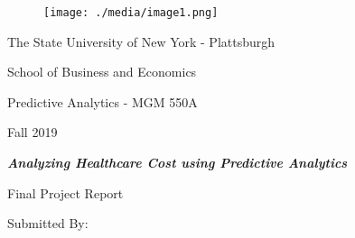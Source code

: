 \documentclass[12pt]{article}
\begin{document}

\begin{figure}[H]
\advance\leftskip 2.11in		\texttt{[image: ./media/image1.png]}
\end{figure}



\begin{adjustwidth}{1.0in}{0.0in}
 The State University of New York - Plattsburgh\par

\end{adjustwidth}

\begin{Center}
School of Business and Economics
\end{Center}\par


\vspace{\baselineskip}
\begin{Center}
Predictive Analytics - MGM 550A
\end{Center}\par

\begin{Center}
Fall 2019
\end{Center}\par


\vspace{\baselineskip}

\vspace{\baselineskip}
\begin{Center}
{\fontsize{24pt}{28.8pt}\selectfont \textbf{\textit{Analyzing Healthcare Cost using Predictive Analytics}}\par}
\end{Center}\par


\vspace{\baselineskip}
\begin{Center}
{\fontsize{14pt}{16.8pt}\selectfont Final Project Report\par}
\end{Center}\par


\vspace{\baselineskip}

\vspace{\baselineskip}
\begin{Center}
Submitted By:
\end{Center}\par
\end{document}
